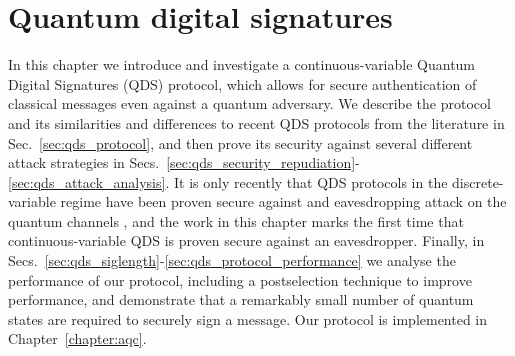 %

\chapter{Quantum digital signatures}\label{chapter:qds}


In this chapter we introduce and investigate a continuous-variable Quantum Digital Signatures (QDS) protocol, which allows for secure authentication of classical messages even against a quantum adversary. We describe the protocol and its similarities and differences to recent QDS protocols from the literature in Sec.~\ref{sec:qds_protocol}, and then prove its security against several different attack strategies in Secs.~\ref{sec:qds_security_repudiation}-\ref{sec:qds_attack_analysis}. It is only recently that QDS protocols in the discrete-variable regime have been proven secure against and eavesdropping attack on the quantum channels \cite{Amiri2016, Yin2016}, and the work in this chapter marks the first time that continuous-variable QDS is proven secure against an eavesdropper. Finally, in Secs.~\ref{sec:qds_siglength}-\ref{sec:qds_protocol_performance} we analyse the performance of our protocol, including a postselection technique to improve performance, and demonstrate that a remarkably small number of quantum states are required to securely sign a message. Our protocol is implemented in Chapter~\ref{chapter:aqc}.

